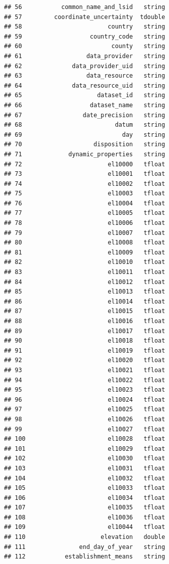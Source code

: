 \documentclass[
  10pt,
]{article}
\begin{document}
\begin{verbatim}
## 56           common_name_and_lsid   string
## 57         coordinate_uncertainty  tdouble
## 58                        country   string
## 59                   country_code   string
## 60                         county   string
## 61                  data_provider   string
## 62              data_provider_uid   string
## 63                  data_resource   string
## 64              data_resource_uid   string
## 65                     dataset_id   string
## 66                   dataset_name   string
## 67                 date_precision   string
## 68                          datum   string
## 69                            day   string
## 70                    disposition   string
## 71             dynamic_properties   string
## 72                        el10000   tfloat
## 73                        el10001   tfloat
## 74                        el10002   tfloat
## 75                        el10003   tfloat
## 76                        el10004   tfloat
## 77                        el10005   tfloat
## 78                        el10006   tfloat
## 79                        el10007   tfloat
## 80                        el10008   tfloat
## 81                        el10009   tfloat
## 82                        el10010   tfloat
## 83                        el10011   tfloat
## 84                        el10012   tfloat
## 85                        el10013   tfloat
## 86                        el10014   tfloat
## 87                        el10015   tfloat
## 88                        el10016   tfloat
## 89                        el10017   tfloat
## 90                        el10018   tfloat
## 91                        el10019   tfloat
## 92                        el10020   tfloat
## 93                        el10021   tfloat
## 94                        el10022   tfloat
## 95                        el10023   tfloat
## 96                        el10024   tfloat
## 97                        el10025   tfloat
## 98                        el10026   tfloat
## 99                        el10027   tfloat
## 100                       el10028   tfloat
## 101                       el10029   tfloat
## 102                       el10030   tfloat
## 103                       el10031   tfloat
## 104                       el10032   tfloat
## 105                       el10033   tfloat
## 106                       el10034   tfloat
## 107                       el10035   tfloat
## 108                       el10036   tfloat
## 109                       el10044   tfloat
## 110                     elevation   double
## 111               end_day_of_year   string
## 112           establishment_means   string

\end{verbatim}
\end{document}
